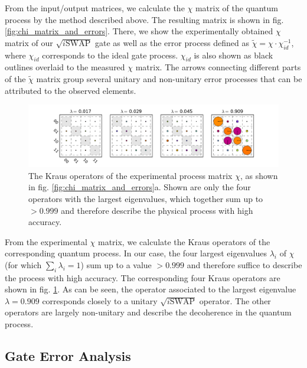 \smallskip

From the input/output matrices, we calculate the $\chi$ matrix of the quantum process by the method described above. The resulting matrix is shown in fig. \ref{fig:chi_matrix_and_errors}. There, we show the experimentally obtained $\chi$ matrix of our $\sqrt{i\mathrm{SWAP}}$ gate as well as the error process defined as $\tilde{\chi} = \chi\cdot\chi_{id}^{-1}$, where $\chi_{id}$ corresponds to the ideal gate process. $\chi_{id}$ is also shown as black outlines overlaid to the measured $\chi$ matrix. The arrows connecting different parts of the $\tilde{\chi}$ matrix group several unitary and non-unitary error processes that can be attributed to the observed elements.

\smallskip

\begin{figure}[ht!]
	\centering
		\includegraphics[width=1.\textwidth]{"./data/ct5/2011_04_21 - grover and tomo/good_data/process_kraus_operators"}
	\caption{The Kraus operators of the experimental process matrix $\chi$, as shown in fig. \ref{fig:chi_matrix_and_errors}a. Shown are only the four operators with the largest eigenvalues, which together sum up to $>0.999$ and therefore describe the physical process with high accuracy.}
	\label{fig:kraus_operators}
\end{figure}

From the experimental $\chi$ matrix, we calculate the Kraus operators of the corresponding quantum process. In our case, the four largest eigenvalues $\lambda_i$ of $\chi$ (for which $\sum\limits_i \lambda_i = 1$) sum up to a value $>0.999$ and therefore suffice to describe the process with high accuracy. The corresponding four Kraus operators are shown in fig. \ref{fig:kraus_operators}. As can be seen, the operator associated to the largest eigenvalue $\lambda=0.909$ corresponds closely to a unitary $\sqrt{i\mathrm{SWAP}}$ operator. The other operators are largely non-unitary and describe the decoherence in the quantum process.

\subsection{Gate Error Analysis}

